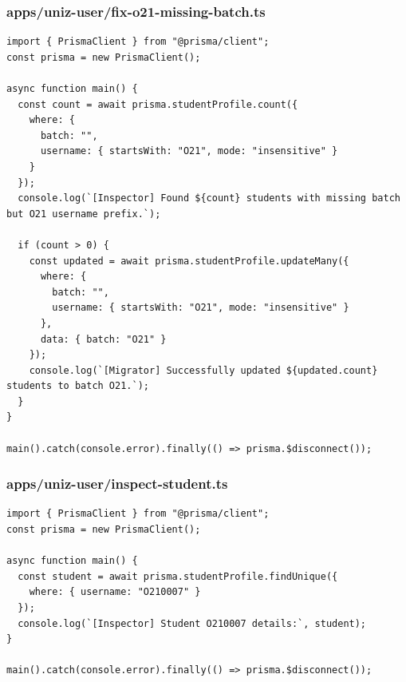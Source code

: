 \documentclass[11pt,a4paper,oneside]{article}
\begin{document}
\subsubsection*{apps/uniz-user/fix-o21-missing-batch.ts}
\begin{lstlisting}
import { PrismaClient } from "@prisma/client";
const prisma = new PrismaClient();

async function main() {
  const count = await prisma.studentProfile.count({
    where: { 
      batch: "",
      username: { startsWith: "O21", mode: "insensitive" }
    }
  });
  console.log(`[Inspector] Found ${count} students with missing batch but O21 username prefix.`);

  if (count > 0) {
    const updated = await prisma.studentProfile.updateMany({
      where: { 
        batch: "",
        username: { startsWith: "O21", mode: "insensitive" }
      },
      data: { batch: "O21" }
    });
    console.log(`[Migrator] Successfully updated ${updated.count} students to batch O21.`);
  }
}

main().catch(console.error).finally(() => prisma.$disconnect());

\end{lstlisting}
\subsubsection*{apps/uniz-user/inspect-student.ts}
\begin{lstlisting}
import { PrismaClient } from "@prisma/client";
const prisma = new PrismaClient();

async function main() {
  const student = await prisma.studentProfile.findUnique({
    where: { username: "O210007" }
  });
  console.log(`[Inspector] Student O210007 details:`, student);
}

main().catch(console.error).finally(() => prisma.$disconnect());

\end{lstlisting}
\end{document}
